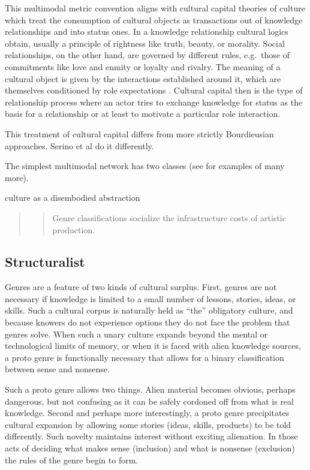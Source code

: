 \documentclass[]{book}
\theoremstyle{definition}
\theoremstyle{definition}
\theoremstyle{definition}
\theoremstyle{remark}
\begin{document}
This multimodal metric convention aligns with cultural capital theories
of culture which treat the consumption of cultural objects as
transactions out of knowledge relationships and into status ones. In a
knowledge relationship cultural logics obtain, usually a principle of
rightness like truth, beauty, or morality. Social relationships, on the
other hand, are governed by different rules, e.g.~those of commitments
like love and enmity or loyalty and rivalry. The meaning of a cultural
object is given by the interactions established around it, which are
themselves conditioned by role expectations
\citep[445]{DiMaggio1987Classification}. Cultural capital then is the
type of relationship process where an actor tries to exchange knowledge
for status as the basis for a relationship or at least to motivate a
particular role interaction.

This treatment of cultural capital differs from more strictly
Bourdieusian approaches. Serino et al \citeyearpar{Serino2017Bridging}
do it differently.

The simplest multimodal network has two classes (see
\citep{Shi2015Weaving} for examples of many more).

culture as a disembodied abstraction \citep{Lizardo2018mutual}

\begin{quote}
\begin{quote}
Genre classifications socialize the infrastructure costs of artistic
production. \citep[445]{DiMaggio1987Classification}
\end{quote}
\end{quote}

\hypertarget{structuralist}{%
\subsection{Structuralist}\label{structuralist}}

Genres are a feature of two kinds of cultural surplus. First, genres are
not necessary if knowledge is limited to a small number of lessons,
stories, ideas, or skills. Such a cultural corpus is naturally held as
``the'' obligatory culture, and because knowers do not experience
options they do not face the problem that genres solve. When such a
unary culture expands beyond the mental or technological limits of
memory, or when it is faced with alien knowledge sources, a proto genre
is functionally necessary that allows for a binary classification
between sense and nonsense.

Such a proto genre allows two things. Alien material becomes obvious,
perhaps dangerous, but not confusing as it can be safely cordoned off
from what is real knowledge. Second and perhaps more interestingly, a
proto genre precipitates cultural expansion by allowing some stories
(ideas, skills, products) to be told differently. Such novelty maintains
interest without exciting alienation. In those acts of deciding what
makes sense (inclusion) and what is nonsense (exclusion) the rules of
the genre begin to form.
\end{document}
